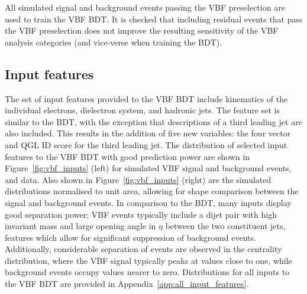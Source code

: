 \noindent All simulated signal and background events passing the VBF preselection are used to train the VBF BDT. It is checked that including residual \ggH events that pass the VBF preselection does not improve the resulting sensitivity of the VBF analysis categories (and vice-verse when training the \ggH BDT). 

\subsection{Input features}

The set of input features provided to the VBF BDT include kinematics of the individual electrons, dielectron system, and hadronic jets. The feature set is similar to the \ggH BDT, with the exception that descriptions of a third leading jet are also included. This results in the addition of five new variables: the four vector and QGL ID score for the third leading jet. The distribution of selected input features to the VBF BDT with good prediction power are shown in Figure~\ref{fig:vbf_inputs} (left) for simulated VBF signal and background events, and data. Also shown in Figure~\ref{fig:vbf_inputs} (right) are the simulated distributions normalised to unit area, allowing for shape comparison between the signal and background events. In comparison to the \ggH BDT, many inputs display good separation power; VBF events typically include a dijet pair with high invariant mass and large opening angle in $\eta$ between the two constituent jets, features which allow for significant suppression of background events. Additionally, considerable separation of events are observed in the centrality distribution, where the VBF signal typically peaks at values close to one, while background events occupy values nearer to zero. Distributions for all inputs to the VBF BDT are provided in Appendix~\ref{app:all_input_features}.


